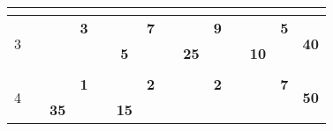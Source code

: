 \documentclass[a4paper, 12pt]{article}
\begin{document}
\begin{table}[H]
\begin{tabular}{|c|cccc|cccc|cccc|cccc|r|}
\cline{2-2}\cline{6-6}\cline{10-10}\cline{14-14}          & \multicolumn{1}{c|}{} &       &       &       & \multicolumn{1}{c|}{} &       &       &       & \multicolumn{1}{c|}{} &       &       &       & \multicolumn{1}{c|}{} & \multicolumn{2}{c}{} &       &  \bigstrut\\
    \hline
    \multirow{4}[6]{*}{3} &       &       & \multicolumn{1}{r|}{} & \textbf{3} &       &       & \multicolumn{1}{r|}{} & \cellcolor[rgb]{ 1,  .753,  0}\textbf{7} &       & \multicolumn{2}{c|}{} & \cellcolor[rgb]{ 1,  .753,  0}\textbf{9} &       &       & \multicolumn{1}{r|}{} & \cellcolor[rgb]{ 1,  .753,  0}\textbf{5} & \multicolumn{1}{c|}{\multirow{4}[6]{*}{\textbf{40}}} \bigstrut\\
\cline{5-5}\cline{9-9}\cline{13-13}\cline{17-17}          &       & \multicolumn{2}{c}{\multirow{2}[2]{*}{}} &       &       & \multicolumn{2}{c}{\multirow{2}[2]{*}{\textbf{5}}} & \multirow{3}[4]{*}{} &       & \multicolumn{2}{c}{\multirow{2}[2]{*}{\textbf{25}}} &       &       & \multicolumn{2}{c}{\multirow{2}[2]{*}{\textbf{10}}} &       &  \bigstrut[t]\\
          &       & \multicolumn{2}{c}{} &       &       & \multicolumn{2}{c}{} &       &       & \multicolumn{2}{c}{} &       &       & \multicolumn{2}{c}{} &       &  \bigstrut[b]\\
\cline{2-2}\cline{6-6}\cline{10-10}\cline{14-14}          & \multicolumn{1}{c|}{} & \multicolumn{2}{c}{} &       & \multicolumn{1}{c|}{} & \multicolumn{2}{c}{} &       & \multicolumn{1}{c|}{} &       &       &       & \multicolumn{1}{c|}{} & \multicolumn{2}{c}{} &       &  \bigstrut\\
    \hline
    \multirow{4}[6]{*}{4} &       &       & \multicolumn{1}{r|}{} & \cellcolor[rgb]{ 1,  .753,  0}\textbf{1} &       &       & \multicolumn{1}{r|}{} & \cellcolor[rgb]{ 1,  .753,  0}\textbf{2} &       &       & \multicolumn{1}{r|}{} & \textbf{2} &       &       & \multicolumn{1}{r|}{} & \textbf{7} & \multicolumn{1}{c|}{\multirow{4}[6]{*}{\textbf{50}}} \bigstrut\\
\cline{5-5}\cline{9-9}\cline{13-13}\cline{17-17}          &       & \multicolumn{2}{c}{\multirow{2}[2]{*}{\textbf{35}}} &       &       & \multicolumn{2}{c}{\multirow{2}[2]{*}{\textbf{15}}} &       &       & \multicolumn{2}{c}{\multirow{2}[2]{*}{}} &       &       & \multicolumn{2}{c}{\multirow{2}[2]{*}{}} &       &  \bigstrut[t]\\
          &       & \multicolumn{2}{c}{} &       &       & \multicolumn{2}{c}{} &       &       & \multicolumn{2}{c}{} &       &       & \multicolumn{2}{c}{} &       &  \bigstrut[b]\\

\end{tabular}
\end{table}
\end{document}
